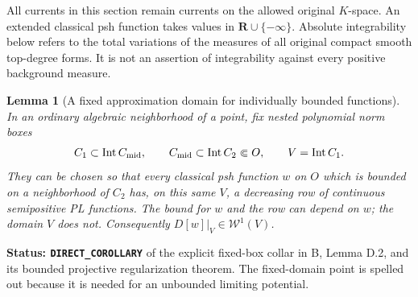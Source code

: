 \documentclass[11pt,a4paper]{article}
\numberwithin{equation}{section}
\newtheorem{lemma}[theorem]{Lemma}
\theoremstyle{definition}
\theoremstyle{remark}
\begin{document}
All currents in this section remain currents on the allowed original
$K$-space. An extended classical psh function takes values in
$\mathbf R\cup\{-\infty\}$. Absolute integrability below refers to
the total variations of the measures of all original compact smooth
top-degree forms. It is not an assertion of integrability against
every positive background measure.

\begin{lemma}[A fixed approximation domain for individually bounded functions]
\label{lem:r6-fixed-box-individual-rows}
In an ordinary algebraic neighborhood of a point, fix nested polynomial
norm boxes
\[
 C_1\subset\operatorname{Int}C_{\rm mid},\qquad
 C_{\rm mid}\subset\operatorname{Int}C_2\Subset O,
 \qquad V=\operatorname{Int}C_1.
\]
They can be chosen so that every classical psh function $w$ on $O$
which is bounded on a neighborhood of $C_2$ has, on this same $V$,
a decreasing row of continuous semipositive PL functions. The
bound for $w$ and the row can depend on $w$; the domain $V$ does not.
Consequently $D[w]|_V\in\mathcal W^1(V)$.
\end{lemma}

\noindent\textbf{Status: \texttt{DIRECT\_COROLLARY}} of the
explicit fixed-box collar in B, Lemma D.2, and its bounded projective
regularization theorem. The fixed-domain point is spelled out because
it is needed for an unbounded limiting potential.
\end{document}
